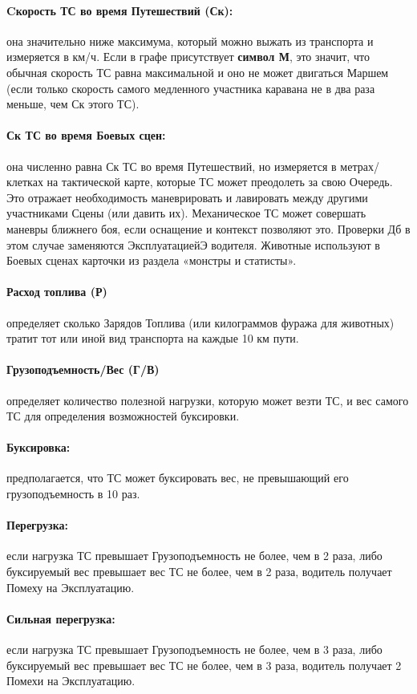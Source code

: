\paragraph{Cкорость ТС во время Путешествий (Ск):} она значительно ниже максимума, который можно выжать из транспорта и измеряется в км/ч. 
\newline Если в графе присутствует \textbf{символ М}, это значит, что обычная скорость ТС равна максимальной и оно не может двигаться Маршем (если только скорость самого медленного участника каравана не в два раза меньше, чем Ск этого ТС).
\paragraph{Ск ТС во время Боевых сцен:} она численно равна Ск ТС во время Путешествий, но измеряется в метрах/клетках на тактической карте, которые ТС может преодолеть за свою Очередь. Это отражает необходимость маневрировать и лавировать между другими участниками Сцены (или давить их). Механическое ТС может совершать маневры ближнего боя, если оснащение и контекст позволяют это. Проверки Дб в этом случае заменяются ЭксплуатациейЭ водителя.
Животные используют в Боевых сценах карточки из раздела «монстры и статисты».
\paragraph{Расход топлива (Р)} определяет сколько Зарядов Топлива (или килограммов фуража для животных) тратит тот или иной вид транспорта на каждые 10 км пути.
\paragraph{Грузоподъемность/Вес (Г/В)} определяет количество полезной нагрузки, которую может везти ТС, и вес самого ТС для определения возможностей буксировки.
\paragraph{Буксировка:} предполагается, что ТС может буксировать вес, не превышающий его грузоподъемность в 10 раз.
\paragraph{Перегрузка:} если нагрузка ТС превышает Грузоподъемность не более, чем в 2 раза, либо буксируемый вес превышает вес ТС не более, чем в 2 раза, водитель получает Помеху на Эксплуатацию.
\paragraph{Сильная перегрузка:} если нагрузка ТС превышает Грузоподъемность не более, чем в 3 раза, либо буксируемый вес превышает вес ТС не более, чем в 3 раза, водитель получает 2 Помехи на Эксплуатацию.
